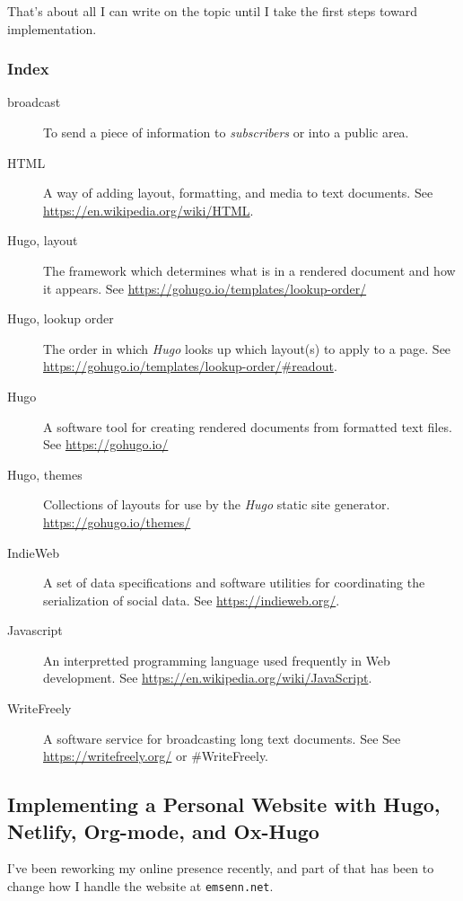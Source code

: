 \documentclass[11pt]{article}
\begin{document}
That's about all I can write on the topic until I take the first steps
toward implementation.
\subsubsection*{Index}
\label{sec:org93da482}
\begin{description}
\item[{broadcast}] To send a piece of information to \emph{subscribers} or into a public area.
\item[{HTML}] A way of adding layout, formatting, and media to text documents. See \href{https://en.wikipedia.org/wiki/HTML}{https://en.wikipedia.org/wiki/HTML}.
\item[{Hugo, layout}] The framework which determines what is in a rendered document and how it appears. See \href{https://gohugo.io/templates/lookup-order/}{https://gohugo.io/templates/lookup-order/}
\item[{Hugo, lookup order}] The order in which \emph{Hugo} looks up which layout(s) to apply to a page. See \href{https://gohugo.io/templates/lookup-order/\#readout}{https://gohugo.io/templates/lookup-order/\#readout}.
\item[{Hugo}] A software tool for creating rendered documents from formatted text files. See \href{https://gohugo.io/}{https://gohugo.io/}
\item[{Hugo, themes}] Collections of layouts for use by the \emph{Hugo} static site generator. \url{https://gohugo.io/themes/}
\item[{IndieWeb}] A set of data specifications and software utilities for coordinating the serialization of social data. See \href{https://indieweb.org/}{https://indieweb.org/}.
\item[{Javascript}] An interpretted programming language used frequently in Web development. See \href{https://en.wikipedia.org/wiki/JavaScript}{https://en.wikipedia.org/wiki/JavaScript}.
\item[{WriteFreely}] A software service for broadcasting long text documents. See See \href{https://writefreely.org/}{https://writefreely.org/} or \#WriteFreely.
\end{description}
\subsection*{Implementing a Personal Website with Hugo, Netlify, Org-mode, and Ox-Hugo}
\label{sec:orgfb06bce}
I've been reworking my online presence recently, and part of that has
been to change how I handle the website at \texttt{emsenn.net}.
\end{document}
